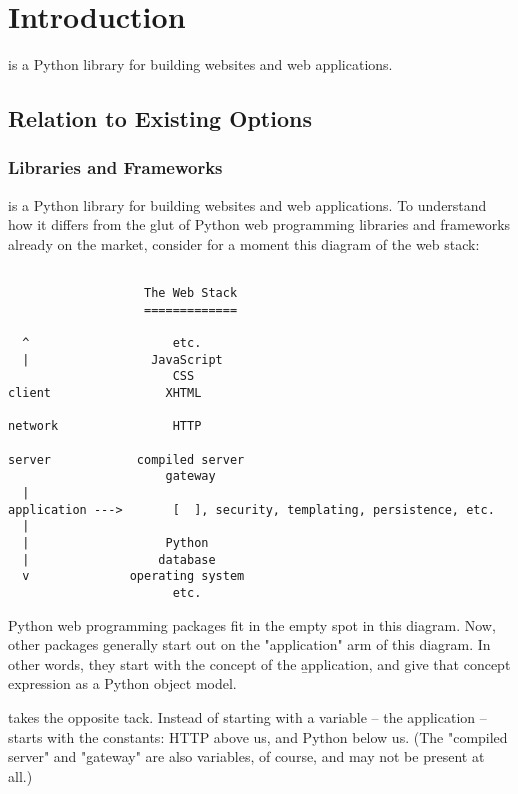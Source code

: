 \chapter{Introduction}

 is a Python library for building websites and web applications.



\section{Relation to Existing Options}

\subsection{Libraries and Frameworks}

 is a Python library for building websites and web applications.
To understand how it differs from the glut of Python web programming libraries
and frameworks already on the market, consider for a moment this diagram of the
web stack:

\begin{verbatim}

                   The Web Stack
                   =============

  ^                    etc.
  |                 JavaScript
                       CSS
client                XHTML

network                HTTP

server            compiled server
                      gateway
  |
application --->       [  ], security, templating, persistence, etc.
  |
  |                   Python
  |                  database
  v              operating system
                       etc.

\end{verbatim}

Python web programming packages fit in the empty spot in this diagram. Now,
other packages generally start out on the "application" arm of this diagram. In
other words, they start with the concept of the \b{application}, and give that
concept expression as a Python object model.

 takes the opposite tack. Instead of starting with a variable --
the application --  starts with the constants: HTTP above us, and
Python below us. (The "compiled server" and "gateway" are also variables, of
course, and may not be present at all.)

